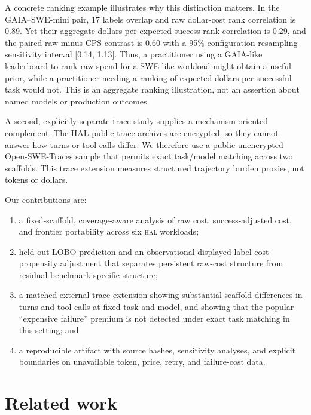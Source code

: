 \documentclass[11pt]{article}
\newcommand{\hal}{\textsc{hal}}
\begin{document}
A concrete ranking example illustrates why this distinction matters. In the GAIA--SWE-mini pair, 17 labels overlap and raw dollar-cost rank correlation is 0.89. Yet their aggregate dollars-per-expected-success rank correlation is 0.29, and the paired raw-minus-CPS contrast is 0.60 with a 95\% configuration-resampling sensitivity interval [0.14, 1.13]. Thus, a practitioner using a GAIA-like leaderboard to rank raw spend for a SWE-like workload might obtain a useful prior, while a practitioner needing a ranking of expected dollars per successful task would not. This is an aggregate ranking illustration, not an assertion about named models or production outcomes.

A second, explicitly separate trace study supplies a mechanism-oriented complement. The HAL public trace archives are encrypted, so they cannot answer how turns or tool calls differ. We therefore use a public unencrypted Open-SWE-Traces sample that permits exact task/model matching across two scaffolds. This trace extension measures structured trajectory burden proxies, not tokens or dollars.

Our contributions are:
\begin{enumerate}[leftmargin=*,nosep]
\item a fixed-scaffold, coverage-aware analysis of raw cost, success-adjusted cost, and frontier portability across six \hal{} workloads;
\item held-out LOBO prediction and an observational displayed-label cost-propensity adjustment that separates persistent raw-cost structure from residual benchmark-specific structure;
\item a matched external trace extension showing substantial scaffold differences in turns and tool calls at fixed task and model, and showing that the popular ``expensive failure'' premium is not detected under exact task matching in this setting; and
\item a reproducible artifact with source hashes, sensitivity analyses, and explicit boundaries on unavailable token, price, retry, and failure-cost data.
\end{enumerate}

\section{Related work}
\end{document}
